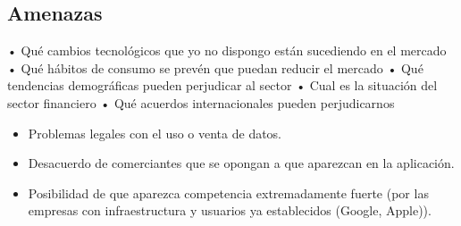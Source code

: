 \subsection{Amenazas}
• Qué cambios tecnológicos que yo no dispongo están sucediendo en el mercado 
• Qué hábitos de consumo se prevén que puedan reducir el mercado 
• Qué tendencias demográficas pueden perjudicar al sector 
• Cual es la situación del sector financiero 
• Qué acuerdos internacionales pueden perjudicarnos 

\begin{itemize}
    \item Problemas legales con el uso o venta de datos.
    \item Desacuerdo de comerciantes que se opongan a que aparezcan en la aplicación.
    \item Posibilidad de que aparezca competencia extremadamente fuerte (por las empresas con infraestructura y usuarios ya establecidos (Google, Apple)).
\end{itemize}
